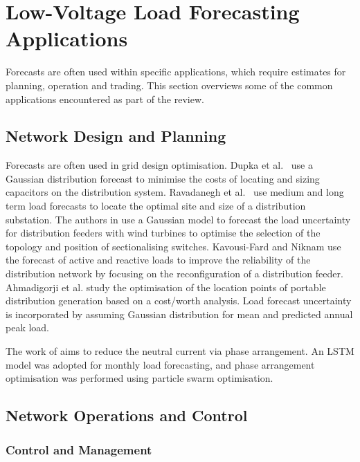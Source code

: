 \section{Low-Voltage Load Forecasting Applications}
\label{sec:LVLF-applications}


Forecasts are often used within specific applications, which require estimates for planning,  operation and trading. This section overviews some of the common applications encountered as part of the review. 

\subsection{Network Design and Planning}

Forecasts are often used in grid design optimisation. Dupka et al.~\cite{Dupka2011FSP} use a Gaussian distribution forecast to minimise the costs of locating and sizing capacitors on the distribution system. Ravadanegh et al.~\cite{ravadanegh2013hao} use medium and long term load forecasts to locate the optimal site and size of a distribution substation. The authors in \cite{kavousifard2014mop} use a Gaussian model to forecast the load uncertainty for distribution feeders with wind turbines to optimise the selection of the topology and position of sectionalising switches. Kavousi-Fard and Niknam \cite{Kavousi2014msd} use the forecast of active and reactive loads to improve the reliability of the distribution network by focusing on the reconfiguration of a distribution feeder. Ahmadigorji et al. \cite{ahmadigorji2009odp} study the optimisation of the location points of portable distribution generation based on a cost/worth analysis. Load forecast uncertainty is incorporated by assuming Gaussian distribution for mean and predicted annual peak load.

The work of \cite{Lee2020ncr} aims to reduce the neutral current via phase arrangement. An LSTM model was adopted for monthly load forecasting, and phase arrangement optimisation was performed using particle swarm optimisation.

\subsection{Network Operations and Control}

\subsubsection{Control and Management}

